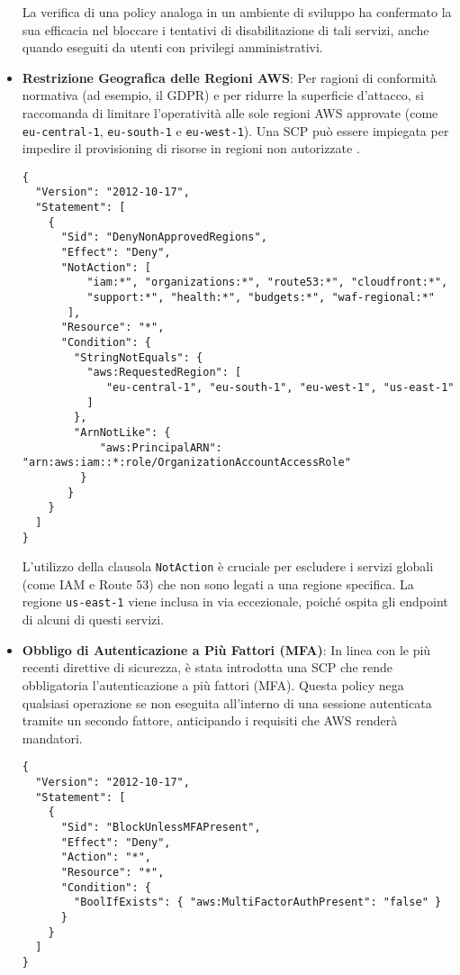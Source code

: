 \begin{itemize}
    La verifica di una policy analoga in un ambiente di sviluppo ha confermato la sua efficacia nel bloccare i tentativi di disabilitazione di tali servizi, anche quando eseguiti da utenti con privilegi amministrativi.

    \item \textbf{Restrizione Geografica delle Regioni AWS}: Per ragioni di conformità normativa (ad esempio, il GDPR) e per ridurre la superficie d'attacco, si raccomanda di limitare l'operatività alle sole regioni AWS approvate (come \texttt{eu-central-1}, \texttt{eu-south-1} e \texttt{eu-west-1}). Una SCP può essere impiegata per impedire il provisioning di risorse in regioni non autorizzate \cite{awsbuilders:scps}.

    \begin{lstlisting}[style=json, caption={SCP per limitare le regioni AWS utilizzabili}, label=lst:scp-region-restriction]
{
  "Version": "2012-10-17",
  "Statement": [
    {
      "Sid": "DenyNonApprovedRegions",
      "Effect": "Deny",
      "NotAction": [ 
          "iam:*", "organizations:*", "route53:*", "cloudfront:*", 
          "support:*", "health:*", "budgets:*", "waf-regional:*" 
       ],
      "Resource": "*",
      "Condition": {
        "StringNotEquals": {
          "aws:RequestedRegion": [
             "eu-central-1", "eu-south-1", "eu-west-1", "us-east-1" 
          ]
        },
        "ArnNotLike": { 
            "aws:PrincipalARN": "arn:aws:iam::*:role/OrganizationAccountAccessRole"
         }
       }
    }
  ]
}
    \end{lstlisting}
    
    L'utilizzo della clausola \texttt{NotAction} è cruciale per escludere i servizi globali (come IAM e Route 53) che non sono legati a una regione specifica. La regione \texttt{us-east-1} viene inclusa in via eccezionale, poiché ospita gli endpoint di alcuni di questi servizi.

    \item \textbf{Obbligo di Autenticazione a Più Fattori (MFA)}: In linea con le più recenti direttive di sicurezza, è stata introdotta una SCP che rende obbligatoria l'autenticazione a più fattori (MFA). Questa policy nega qualsiasi operazione se non eseguita all'interno di una sessione autenticata tramite un secondo fattore, anticipando i requisiti che AWS renderà mandatori.

    \begin{lstlisting}[style=json, caption={SCP per richiedere l'uso obbligatorio di MFA (\texttt{RequireMFA})}, label=lst:scp-mfa]
{
  "Version": "2012-10-17",
  "Statement": [
    {
      "Sid": "BlockUnlessMFAPresent",
      "Effect": "Deny",
      "Action": "*",
      "Resource": "*",
      "Condition": {
        "BoolIfExists": { "aws:MultiFactorAuthPresent": "false" }
      }
    }
  ]
}
    \end{lstlisting}

\end{itemize}
